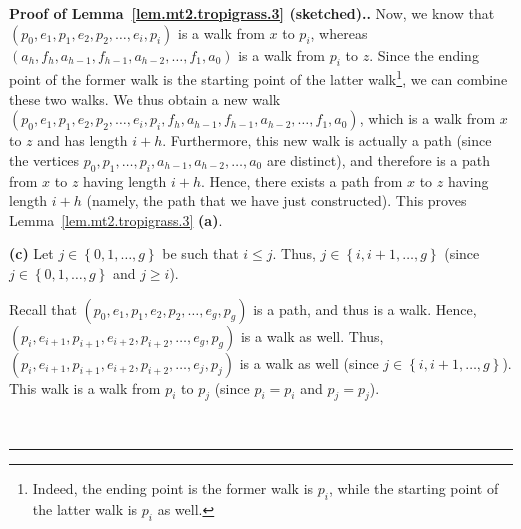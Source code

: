 \documentclass[numbers=enddot,12pt,final,onecolumn,notitlepage]{scrartcl}%
\theoremstyle{definition}
\newenvironment{proof}[1][Proof]{\noindent\textbf{#1.} }{\ \rule{0.5em}{0.5em}}
\newcommand{\set}[1]{\left\{ #1 \right\}}
\newcommand{\tup}[1]{\left( #1 \right)}
\begin{document}
\begin{proof}[Proof of Lemma~\ref{lem.mt2.tropigrass.3} (sketched).]
Now, we know that
$\tup{p_0, e_1, p_1, e_2, p_2, \ldots, e_i, p_i}$ is a walk
from $x$ to $p_i$, whereas
$\tup{a_h, f_h, a_{h-1}, f_{h-1}, a_{h-2}, \ldots, f_1, a_0}$
is a walk from $p_i$ to $z$.
Since the ending point of the former walk is the starting
point of the latter walk\footnote{Indeed, the ending point is the
    former walk is $p_i$, while the starting point of the latter
    walk is $p_i$ as well.},
we can combine these two walks.
We thus obtain a new walk
$\tup{p_0, e_1, p_1, e_2, p_2, \ldots, e_i, p_i, f_h,
      a_{h-1}, f_{h-1}, a_{h-2}, \ldots, f_1, a_0}$,
which is a walk from $x$ to $z$ and has length
$i + h$.
Furthermore, this new walk is actually a path
(since the vertices
$p_0, p_1, \ldots, p_i, a_{h-1}, a_{h-2}, \ldots, a_0$
are distinct),
and therefore is a path from $x$ to $z$ having length
$i + h$.
Hence, there exists a path from $x$ to $z$ having
length $i + h$ (namely, the path that we have just
constructed).
This proves Lemma~\ref{lem.mt2.tropigrass.3} \textbf{(a)}.

\textbf{(c)} Let $j \in \set{0, 1, \ldots, g}$ be such that
$i \leq j$.
Thus, $j \in \set{i, i+1, \ldots, g}$ (since
$j \in \set{0, 1, \ldots, g}$ and $j \geq i$).

Recall that
$\tup{p_0, e_1, p_1, e_2, p_2, \ldots, e_g, p_g}$ is a path,
and thus is a walk.
Hence,
$\tup{p_i, e_{i+1}, p_{i+1}, e_{i+2}, p_{i+2}, \ldots, e_g, p_g}$
is a walk as well.
Thus,
$\tup{p_i, e_{i+1}, p_{i+1}, e_{i+2}, p_{i+2}, \ldots, e_j, p_j}$
is a walk as well (since $j \in \set{i, i+1, \ldots, g}$).
This walk is a walk from $p_i$ to $p_j$ (since $p_i = p_i$ and
$p_j = p_j$).


\end{proof}
\end{document}
